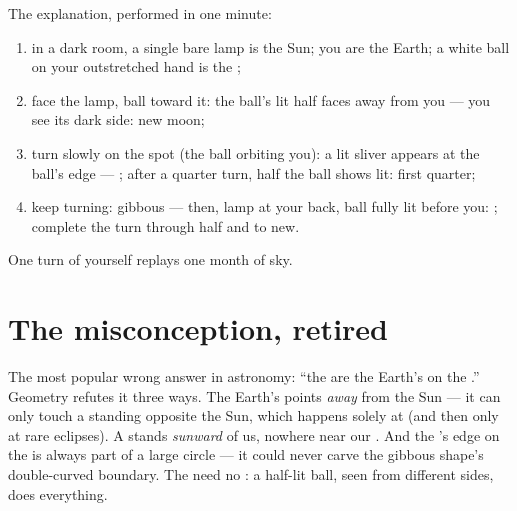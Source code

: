 \begin{method}\label{met:g7:moon-phases:walk}
The explanation, performed in one minute:
\begin{enumerate}
  \item in a dark room, a single bare lamp is the Sun; you are
        the Earth; a white ball on your outstretched hand is the
        ;
  \item face the lamp, ball toward it: the ball's lit half faces
        away from you --- you see its dark side: new moon;
  \item turn slowly on the spot (the ball orbiting you): a lit
        sliver appears at the ball's edge ---  ;
        after a quarter turn, half the ball shows lit: first
        quarter;
  \item keep turning: gibbous --- then, lamp at your back, ball
        fully lit before you: ; complete the turn
        through  half and  to new.
\end{enumerate}
One turn of yourself replays one month of sky.
\end{method}

\section{The misconception, retired}

\begin{proposition}\label{prop:g7:moon-phases:notshadow}
The most popular wrong answer in astronomy: ``the  are the
Earth's  on the .'' Geometry refutes it three ways.
The Earth's  points \emph{away} from the Sun --- it can
only touch a  standing opposite the Sun, which happens
solely at  (and then only at rare eclipses). A 
 stands \emph{sunward} of us, nowhere near our . And
the 's edge on the  is always part of a large circle
--- it could never carve the gibbous shape's double-curved
boundary. The  need no : a half-lit ball, seen from
different sides, does everything.
\end{proposition}

